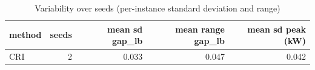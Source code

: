 \begin{table}[htbp]
\centering
\small
\caption{Variability over seeds (per-instance standard deviation and range)}
\label{tab:E10b_state_of_the_art_60s_b60_seeds}
\begin{tabular}{lrrrr}
\toprule
method & seeds & mean sd gap\_lb & mean range gap\_lb & mean sd peak (kW) \\
\midrule
CRI & 2 & 0.033 & 0.047 & 0.042 \\
\bottomrule
\end{tabular}
\end{table}
